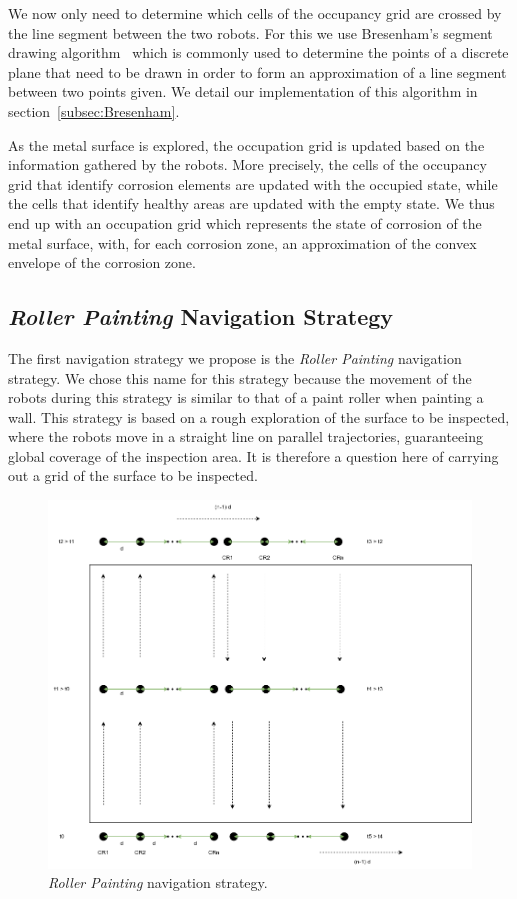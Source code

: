 We now only need to determine which cells of the occupancy grid are crossed by the line segment between the two robots.
For this we use Bresenham's segment drawing algorithm~\cite{enwiki:1155124335} which is commonly used to determine the points of a discrete plane that need to be drawn in order to form an approximation of a line segment between two points given.
We detail our implementation of this algorithm in section~\ref{subsec:Bresenham}.

As the metal surface is explored, the occupation grid is updated based on the information gathered by the robots.
More precisely, the cells of the occupancy grid that identify corrosion elements are updated with the occupied state, while the cells that identify healthy areas are updated with the empty state.
We thus end up with an occupation grid which represents the state of corrosion of the metal surface, with, for each corrosion zone, an approximation of the convex envelope of the corrosion zone.

\subsection{\textit{Roller Painting} Navigation Strategy}

The first navigation strategy we propose is the \textit{Roller Painting} navigation strategy.
We chose this name for this strategy because the movement of the robots during this strategy is similar to that of a paint roller when painting a wall.
This strategy is based on a rough exploration of the surface to be inspected, where the robots move in a straight line on parallel trajectories, guaranteeing global coverage of the inspection area.
It is therefore a question here of carrying out a grid of the surface to be inspected.

\begin{figure}[h!]
	\centering
	\includegraphics[scale=0.5]{graphics/peinture_au_rouleau.png}
	\caption{\textit{Roller Painting} navigation strategy.}
	\label{fig:peinture_au_rouleau}
\end{figure}


